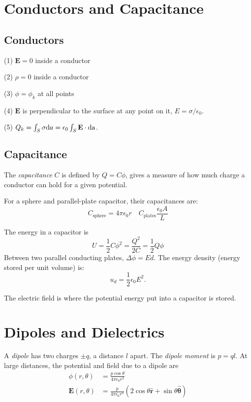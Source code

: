 \section{Conductors and Capacitance}
\subsection*{Conductors}
(1) $\mathbf{E} = 0$ inside a conductor

(2) $\rho = 0$ inside a conductor

(3) $\phi = \phi_k$ at all points

(4) $\mathbf{E}$ is perpendicular to the surface at any point on it, $E = \sigma / \epsilon_0$.

(5) $Q_k = \int_S \sigma \differential a = \epsilon_0 \int_S \mathbf{E} \cdot \differential \mathrm{a}$.

\subsection*{Capacitance}

The \textit{capacitance} $C$ is defined by $Q=C\phi$, gives a measure of how much charge a conductor can hold
for a given potential.

For a sphere and parallel-plate capacitor, their capacitances are:
\begin{equation*}
    C_{\textrm{sphere}} = 4 \pi \epsilon_0 r \quad C_{\textrm{plates}} \frac{\epsilon_0 A}{L}
\end{equation*}

The energy in a capacitor is
\begin{equation*}
    U = \frac{1}{2}C\phi^2 = \frac{Q^2}{2C} = \frac{1}{2}Q\phi
\end{equation*}
Between two parallel conducting plates, $\Delta \phi = Ed$. The energy density (energy stored per unit volume) is:
\begin{equation*}
    u_d = \frac{1}{2}\epsilon_0 E^2.
\end{equation*}

The electric field is where the potential energy put into a capacitor is stored.

\section{Dipoles and Dielectrics}
A \textit{dipole} has two charges $\pm q$, a distance $l$ apart. The \textit{dipole moment} is $p = ql$. At 
large distances, the potential and field due to a dipole are
\begin{equation*}
    \begin{aligned}
        \phi(r,\theta) &= \frac{p \cos \theta}{4 \pi \epsilon_0 r^2} \\
        \mathbf{E}(r,\theta) &= \frac{p}{4 \pi \epsilon_0 r^3}(2 \cos \theta \mathbf{\hat{r}} + \sin \theta \pmb{\hat{\theta}})
    \end{aligned}
\end{equation*}

